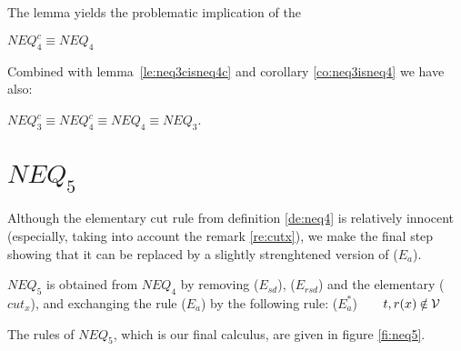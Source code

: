 
%
\noindent
The lemma yields the problematic implication of the 
\begin{THEOREM}\label{th:neq4cisneq4}
 $NEQ_4^c \equiv NEQ_4$ \end{THEOREM}
Combined with lemma~\ref{le:neq3cisneq4c} and corollary \ref{co:neq3isneq4} 
we have also:
\begin{COROLLARY}
$NEQ_3^c \equiv NEQ_4^c \equiv NEQ_4 \equiv NEQ_3$.
\end{COROLLARY}

\section{$NEQ_5$}\label{se:lastNEQ}
Although the elementary cut rule  from definition \ref{de:neq4}
is relatively innocent (especially, taking into account the remark
\ref{re:cutx}), we make the final step showing that it can be replaced by a
slightly strenghtened version of ($E_a$).
\begin{DEFINITION}\label{de:neq5}
 $NEQ_5$ is obtained from $NEQ_4$ by removing ($E_{sd}$), ($E_{rsd}$) and the elementary
 ($cut_x$), and exchanging the rule ($E_a$) by the following rule:
 ($E_a^*$)\ \ \ \ $t,r(x)\not\in\Vars$
\end{DEFINITION}
The rules of $NEQ_5$, which is our final calculus, are given in figure \ref{fi:neq5}.

